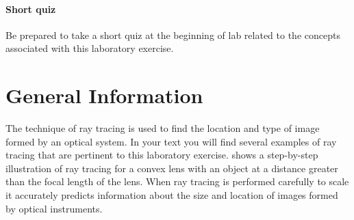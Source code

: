 \begin{multicols}{2}
\paragraph{Short quiz}
  Be prepared to take a short quiz at the beginning of lab related to the concepts associated with this laboratory exercise.

\section{General Information}


The technique of ray tracing is used to find the location and type of image formed by an optical system. In your text you will find several examples of ray tracing that are pertinent to this laboratory exercise.  shows a step-by-step illustration of ray tracing for a convex lens with an object at a distance greater than the focal length of the lens.  When ray tracing is performed carefully to scale it accurately predicts information about the size and location of images formed by optical instruments.



\end{multicols}
